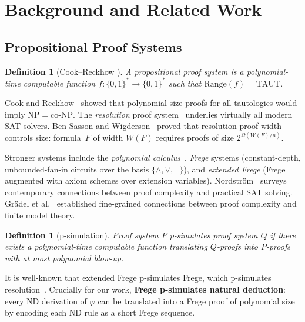 \documentclass[conference]{IEEEtran}
\newtheorem{definition}[theorem]{Definition}
\begin{document}
\section{Background and Related Work}
\label{sec:background}

\subsection{Propositional Proof Systems}

\begin{definition}[Cook--Reckhow \cite{CookReckhow1979}]
A \emph{propositional proof system} is a polynomial-time computable
function $f : \{0,1\}^* \to \{0,1\}^*$ such that
$\mathrm{Range}(f) = \mathrm{TAUT}$.
\end{definition}

Cook and Reckhow~\cite{CookReckhow1979} showed that polynomial-size
proofs for all tautologies would imply
$\mathrm{NP} = \mathrm{co\text{-}NP}$.  The \emph{resolution} proof
system~\cite{Robinson1965} underlies virtually all modern SAT
solvers.  Ben-Sasson and
Wigderson~\cite{Ben-Sasson2001} proved that resolution proof width
controls size: formula~$F$ of width $W(F)$ requires proofs of size
$2^{\Omega(W(F)/n)}$.

Stronger systems include the \emph{polynomial
calculus}~\cite{Tzameret2011,AtseriasOchremiak2019}, \emph{Frege}
systems (constant-depth, unbounded-fan-in circuits over the basis
$\{\wedge, \vee, \neg\}$), and \emph{extended Frege} (Frege augmented
with axiom schemes over extension variables).
Nordstr\"{o}m~\cite{NordstromProofComplexity2025} surveys
contemporary connections between proof complexity and practical SAT
solving.  Gr\"{a}del et al.~\cite{GradelGrohe2019} established fine-grained
connections between proof complexity and finite model theory.

\begin{definition}[p-simulation]
Proof system $P$ \emph{p-simulates} proof system $Q$ if there exists
a polynomial-time computable function translating $Q$-proofs into
$P$-proofs with at most polynomial blow-up.
\end{definition}

It is well-known that extended Frege p-simulates Frege, which
p-simulates resolution~\cite{Beame1998}.  Crucially for our work,
\textbf{Frege p-simulates natural deduction}: every ND derivation of
$\varphi$ can be translated into a Frege proof of polynomial size by
encoding each ND rule as a short Frege sequence.
\end{document}
